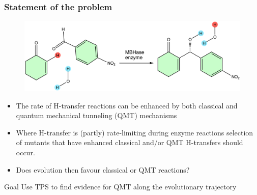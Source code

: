 \documentclass{beamer}
\begin{document}
\begin{frame}
\frametitle{Statement of the problem}
\begin{figure}
\centering
\includegraphics[scale=0.4]{figures/mbh-reaction.png}
\end{figure}
\begin{itemize}[<+-|alert@+>]
\item{The rate of H-transfer reactions can be enhanced by both classical and 
quantum mechanical tunneling (QMT) mechanisms}
\item{Where H-transfer is (partly) rate-limiting during enzyme reactions 
selection of mutants that have enhanced classical and/or QMT H-transfers should
occur.} 
\item {Does evolution then favour classical or QMT reactions?}
\end{itemize}
\pause
\begin{block}{Goal}
Use TPS to find evidence for QMT along the evolutionary trajectory
\end{block}
\end{frame}
\end{document}
